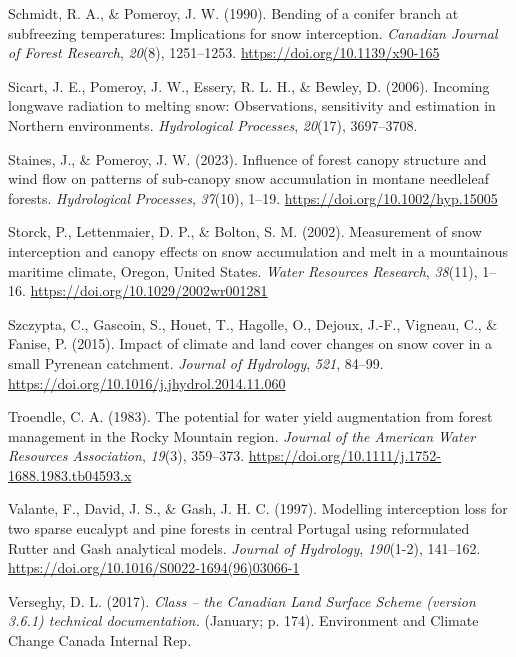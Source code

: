 \documentclass[
]{agujournal2019}
\newlength{\cslhangindent}
\newenvironment{CSLReferences}[2] %
 {\begin{list}{}{%
  \setlength{\itemindent}{0pt}
  \setlength{\leftmargin}{0pt}
  \setlength{\parsep}{0pt}
  \ifodd #1
   \setlength{\leftmargin}{\cslhangindent}
   \setlength{\itemindent}{-1\cslhangindent}
  \fi
  \setlength{\itemsep}{#2\baselineskip}}}
 {\end{list}}
\begin{document}
\begin{CSLReferences}{1}{0}
Schmidt, R. A., \& Pomeroy, J. W. (1990). Bending of a conifer branch at
subfreezing temperatures: Implications for snow interception.
\emph{Canadian Journal of Forest Research}, \emph{20}(8), 1251--1253.
\url{https://doi.org/10.1139/x90-165}

Sicart, J. E., Pomeroy, J. W., Essery, R. L. H., \& Bewley, D. (2006).
Incoming longwave radiation to melting snow: Observations, sensitivity
and estimation in {Northern} environments. \emph{Hydrological
Processes}, \emph{20}(17), 3697--3708.

Staines, J., \& Pomeroy, J. W. (2023). Influence of forest canopy
structure and wind flow on patterns of sub-canopy snow accumulation in
montane needleleaf forests. \emph{Hydrological Processes},
\emph{37}(10), 1--19. \url{https://doi.org/10.1002/hyp.15005}

Storck, P., Lettenmaier, D. P., \& Bolton, S. M. (2002). Measurement of
snow interception and canopy effects on snow accumulation and melt in a
mountainous maritime climate, {Oregon}, {United States}. \emph{Water
Resources Research}, \emph{38}(11), 1--16.
\url{https://doi.org/10.1029/2002wr001281}

Szczypta, C., Gascoin, S., Houet, T., Hagolle, O., Dejoux, J.-F.,
Vigneau, C., \& Fanise, P. (2015). Impact of climate and land cover
changes on snow cover in a small {Pyrenean} catchment. \emph{Journal of
Hydrology}, \emph{521}, 84--99.
\url{https://doi.org/10.1016/j.jhydrol.2014.11.060}

Troendle, C. A. (1983). The potential for water yield augmentation from
forest management in the {Rocky Mountain} region. \emph{Journal of the
American Water Resources Association}, \emph{19}(3), 359--373.
\url{https://doi.org/10.1111/j.1752-1688.1983.tb04593.x}

Valante, F., David, J. S., \& Gash, J. H. C. (1997). Modelling
interception loss for two sparse eucalypt and pine forests in central
{Portugal} using reformulated {Rutter} and {Gash} analytical models.
\emph{Journal of Hydrology}, \emph{190}(1-2), 141--162.
\url{https://doi.org/10.1016/S0022-1694(96)03066-1}

Verseghy, D. L. (2017). \emph{Class -- the {Canadian Land Surface
Scheme} (version 3.6.1) technical documentation.} (January; p. 174).
{Environment and Climate Change Canada Internal Rep.}


\end{CSLReferences}
\end{document}
